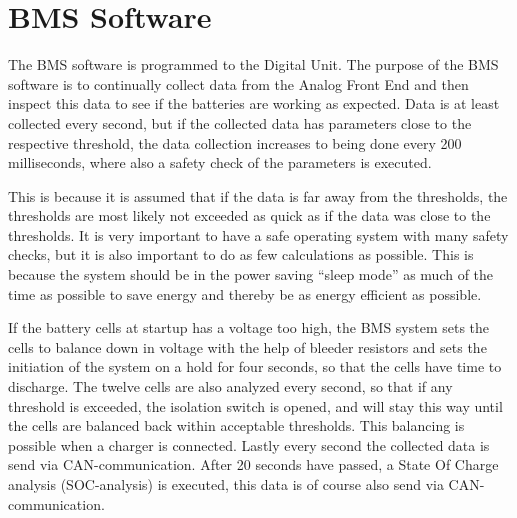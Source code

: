\section{BMS Software}

The BMS software is programmed to the Digital Unit. The purpose of the BMS software is to continually collect data from the Analog Front End and then inspect this data to see if the batteries are working as expected. Data is at least collected every second, but if the collected data has parameters close to the respective threshold, the data collection increases to being done every 200 milliseconds, where also a safety check of the parameters is executed. 

This is because it is assumed that if the data is far away from the thresholds, the thresholds are most likely not exceeded as quick as if the data was close to the thresholds. It is very important to have a safe operating system with many safety checks, but it is also important to do as few calculations as possible. This is because the system should be in the power saving “sleep mode” as much of the time as possible to save energy and thereby be as energy efficient as possible.

If the battery cells at startup has a voltage too high, the BMS system sets the cells to balance down in voltage with the help of bleeder resistors and sets the initiation of the system on a hold for four seconds, so that the cells have time to discharge. The twelve cells are also analyzed every second, so that if any threshold is exceeded, the isolation switch is opened, and will stay this way until the cells are balanced back within acceptable thresholds. This balancing is possible when a charger is connected. Lastly every second the collected data is send via CAN-communication. After 20 seconds have passed, a State Of Charge analysis (SOC-analysis) is executed, this data is of course also send via CAN-communication.

